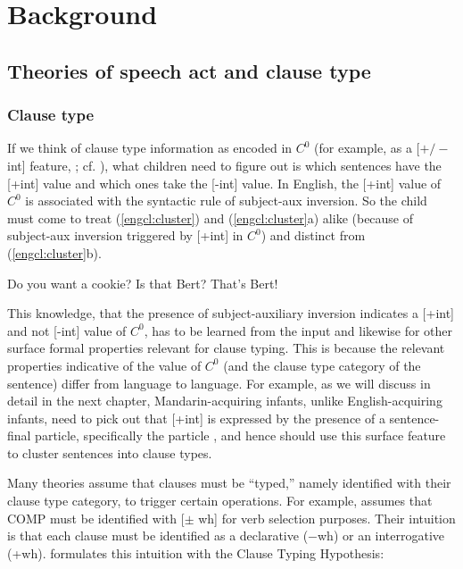 \chapter{Background}
\label{chap:background}


\section{Theories of speech act and clause type} \label{sec:bg:theory}

\subsection{Clause type}
\label{sec:bg:theory:clause}
If we think of clause type information as encoded in $C^{0}$ (for example, as a [$+/-$ int] feature,  \cite{chomskylasnik1977,rizzi1997}; cf. \cite{rizzi2001int}), what children need to figure out is which sentences have the [+int] value and which ones take the [-int] value. In English, the [+int] value of $C^{0}$ is associated with the syntactic rule of subject-aux inversion. So the child must come to treat (\ref{engcl:cluster}) and (\ref{engcl:cluster}a) alike (because of subject-aux inversion triggered by [+int] in $C^{0}$) and distinct from (\ref{engcl:cluster}b).%


Do you want a cookie?
\bxl{}
Is that Bert?
\ex
That’s Bert!
\exl
\eex

This knowledge, that the presence of subject-auxiliary inversion indicates a [+int] and not [-int] value of $C^{0}$, has to be learned from the input and likewise for other surface formal properties relevant for clause typing. This is because the relevant properties indicative of the value of $C^{0}$ (and the clause type category of the sentence) differ from language to language. For example, as we will discuss in detail in the next chapter, Mandarin-acquiring infants, unlike English-acquiring infants, need to pick out that [+int] is expressed by the presence of a sentence-final particle, specifically the particle , and hence should use this surface feature to cluster sentences into clause types.



Many theories assume that clauses must be ``typed,'' namely identified with their clause type category, to trigger certain operations. For example, \textcite{chomskylasnik1977} assumes that COMP must be identified with [$\pm$ wh] for verb selection purposes. Their intuition is that each clause must be identified as a declarative ($-$wh) or an interrogative (+wh). \textcite{cheng1991} formulates this intuition with the Clause Typing Hypothesis:

